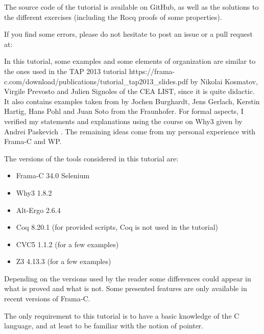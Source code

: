 \begin{Warning}
  The source code of
  the tutorial is available on GitHub, as well as the solutions to the
  different exercises (including the Rocq proofs of some properties).

  If you find some errors, please do not hesitate to post an issue or
  a pull request at:

\end{Warning}


\begin{Information}
  In this tutorial, some examples and some elements of organization are
  similar to the ones used in the
  \externalLink
      {TAP 2013 tutorial}
      {https://frama-c.com/download/publications/tutorial_tap2013_slides.pdf}
  by Nikolai Kosmatov, Virgile Prevosto and Julien
  Signoles of the CEA LIST, since it is quite didactic. It also
  contains examples taken from
  \textit{}
  by Jochen Burghardt, Jens Gerlach, Kerstin Hartig, Hans Pohl and Juan
  Soto from the Fraunhofer. For formal aspects, I verified my statements and
  explanations using the course on Why3 given by Andrei Paskevich
  \textit{}.
  The remaining ideas come from my personal experience with Frama-C and WP.

  \horizontalLine

  The versions of the tools considered in this tutorial are:
  \begin{itemize}
  \item Frama-C 34.0 Selenium
  \item Why3 1.8.2
  \item Alt-Ergo 2.6.4
  \item Coq 8.20.1 (for provided scripts, Coq is not used in the tutorial)
  \item CVC5 1.1.2 (for a few examples)
  \item Z3 4.13.3 (for a few examples)
  \end{itemize}
  Depending on the versions used by the reader some differences could appear in
  what is proved and what is not. Some presented features are only available
  in recent versions of Frama-C.

  \horizontalLine

  The only requirement to this tutorial is to have a basic knowledge of the C
  language, and at least to be familiar with the notion of pointer.
\end{Information}

